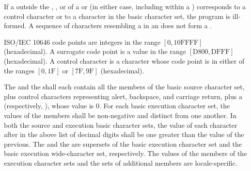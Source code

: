 \documentclass{wg21}
\begin{document}
If a  outside
the , , or
 of
a  or 
(in either case, including within a )
corresponds to a control character or
to a character in the basic
 character set, the program is ill-formed.
    A sequence of characters resembling a  in an
     does not form a
    .
\begin{note}
    ISO/IEC 10646 code points are integers in the range $[0, \mathrm{10FFFF}]$ (hexadecimal).
    A surrogate code point is a value in the range $[\mathrm{D800}, \mathrm{DFFF}]$ (hexadecimal).
    A control character is a character whose code point is
    in either of the ranges $[0, \mathrm{1F}]$ or $[\mathrm{7F}, \mathrm{9F}]$ (hexadecimal).
\end{note}

\pnum
\begin{removedblock}
The  and the
shall each contain all the members of the
basic source character set, plus control characters representing alert,
backspace, and carriage return, plus a 
(respectively, ), whose value is 0.
For each basic execution character set, the values of the
members shall be non-negative and distinct from one another. In both the
source and execution basic character sets, the value of each character
after  in the above list of decimal digits shall be one greater
than the value of the previous. The 
and the  are
supersets of the
basic execution character set and the basic execution wide-character
set, respectively. The values of the members of the execution character sets
and the sets of additional members
are locale-specific.%
\end{removedblock}
\end{document}
